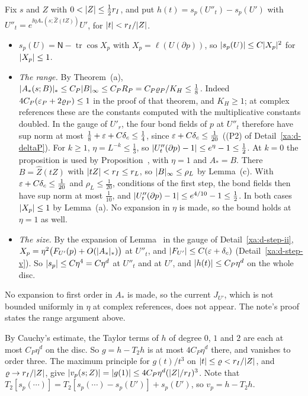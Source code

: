 \begin{detail}
\begin{step}
Fix $s$ and $Z$ with $0<\lvert Z\rvert\le\frac12r_I$, and put $h(t)=s_p(U''_t)-s_p(U')$ with $U''_t=e^{\ii\eta A_*(s;\hat Z(tZ))}U'$, for $\lvert t\rvert<r_I/\lvert Z\rvert$.
\begin{itemize}
\item $s_p(U)=\mathsf N-\operatorname{tr}\cos X_p$ with $X_p=\ell(U(\partial p))$, so $\lvert s_p(U)\rvert\le C\lvert X_p\rvert^2$ for $\lvert X_p\rvert\le1$.
\item \emph{The range.} By Theorem~(a), $\lvert A_*(s;B)\rvert_*\le C_P\lvert B\rvert_\infty\le C_PR_P=C_P\varrho_P/K_H\le\frac18$. Indeed $4C_P(\varepsilon_P+2\varrho_P)\le1$ in the proof of that theorem, and $K_H\ge1$; at complex references these are the constants computed with the multiplicative constants doubled. In the gauge of $U'_r$, the four bond fields of $p$ at $U''_t$ therefore have sup norm at most $\frac18+\varepsilon+C\delta_c\le\frac14$, since $\varepsilon+C\delta_c\le\frac1{20}$ ((P2) of Detail~\ref{xa:d-deltaP}). For $k\ge1$, $\eta=L^{-k}\le\frac13$, so $\lvert U''_t(\partial p)-1\rvert\le e^\eta-1\le\frac12$. At $k=0$ the proposition is used by Proposition~, with $\eta=1$ and $A_*=B$. There $B=\hat Z(tZ)$ with $\lvert tZ\rvert<r_I\le r_L$, so $\lvert B\rvert_\infty\le\rho_L$ by Lemma~(c). With $\varepsilon+C\delta_c\le\frac1{20}$ and $\rho_L\le\frac1{20}$, conditions of the first step, the bond fields then have sup norm at most $\frac1{10}$, and $\lvert U''_t(\partial p)-1\rvert\le e^{4/10}-1\le\frac12$. In both cases $\lvert X_p\rvert\le1$ by Lemma~(a). No expansion in $\eta$ is made, so the bound holds at $\eta=1$ as well.
\item \emph{The size.} By the expansion of Lemma~ in the gauge of Detail~\ref{xa:d-step-ii}, $X_p=\eta^2\big(F_{U'}(p)+O(\lvert A_*\rvert_*)\big)$ at $U''_t$, and $\lvert F_{U'}\rvert\le C(\varepsilon+\delta_c)$ (Detail~\ref{xa:d-step-v}). So $\lvert s_p\rvert\le C\eta^4=C\eta^d$ at $U''_t$ and at $U'$, and $\lvert h(t)\rvert\le C_P\eta^d$ on the whole disc.
\end{itemize}
No expansion to first order in $A_*$ is made, so the current $J_{U'}$, which is not bounded uniformly in $\eta$ at complex references, does not appear. The note's proof states the range argument above.

By Cauchy's estimate, the Taylor terms of $h$ of degree $0$, $1$ and $2$ are each at most $C_P\eta^d$ on the disc. So $g=h-T_2h$ is at most $4C_P\eta^d$ there, and vanishes to order three. The maximum principle for $g(t)/t^3$ on $\lvert t\rvert\le\varrho<r_I/\lvert Z\rvert$, and $\varrho\to r_I/\lvert Z\rvert$, give $\lvert v_p(s;Z)\rvert=\lvert g(1)\rvert\le4C_P\eta^d(\lvert Z\rvert/r_I)^3$. Note that $T_2[s_p(\cdots)]=T_2[s_p(\cdots)-s_p(U')]+s_p(U')$, so $v_p=h-T_2h$.
\end{step}


\end{detail}
